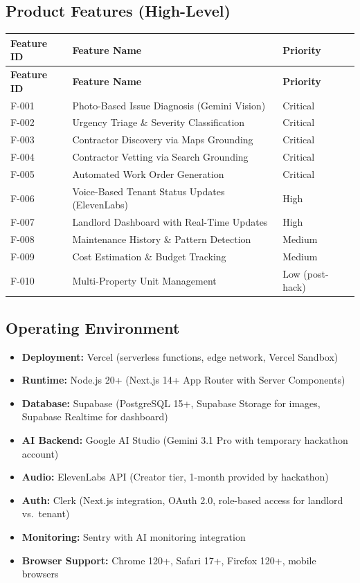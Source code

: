 \documentclass[12pt,a4paper]{article}
\begin{document}
\subsection{Product Features (High-Level)}

\begin{longtable}{L{1.8cm} L{7.5cm} L{3cm}}
\toprule
\textbf{Feature ID} & \textbf{Feature Name} & \textbf{Priority} \\
\midrule
\endfirsthead
\toprule
\textbf{Feature ID} & \textbf{Feature Name} & \textbf{Priority} \\
\midrule
\endhead
\bottomrule
\endfoot
F-001 & Photo-Based Issue Diagnosis (Gemini Vision) & Critical \\
\midrule
F-002 & Urgency Triage \& Severity Classification & Critical \\
\midrule
F-003 & Contractor Discovery via Maps Grounding & Critical \\
\midrule
F-004 & Contractor Vetting via Search Grounding & Critical \\
\midrule
F-005 & Automated Work Order Generation & Critical \\
\midrule
F-006 & Voice-Based Tenant Status Updates (ElevenLabs) & High \\
\midrule
F-007 & Landlord Dashboard with Real-Time Updates & High \\
\midrule
F-008 & Maintenance History \& Pattern Detection & Medium \\
\midrule
F-009 & Cost Estimation \& Budget Tracking & Medium \\
\midrule
F-010 & Multi-Property Unit Management & Low (post-hack) \\
\end{longtable}

\subsection{Operating Environment}

\begin{itemize}
    \item \textbf{Deployment:} Vercel (serverless functions, edge network, Vercel Sandbox)
    \item \textbf{Runtime:} Node.js 20+ (Next.js 14+ App Router with Server Components)
    \item \textbf{Database:} Supabase (PostgreSQL 15+, Supabase Storage for images, Supabase Realtime for dashboard)
    \item \textbf{AI Backend:} Google AI Studio (Gemini 3.1 Pro with temporary hackathon account)
    \item \textbf{Audio:} ElevenLabs API (Creator tier, 1-month provided by hackathon)
    \item \textbf{Auth:} Clerk (Next.js integration, OAuth 2.0, role-based access for landlord vs.\ tenant)
    \item \textbf{Monitoring:} Sentry with AI monitoring integration
    \item \textbf{Browser Support:} Chrome 120+, Safari 17+, Firefox 120+, mobile browsers
\end{itemize}
\end{document}
